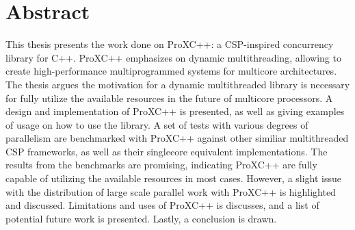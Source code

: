 
\newpage
{}
\section*{Abstract}

This thesis presents the work done on ProXC++: a CSP\hyp{}inspired concurrency library for C++. ProXC++ emphasizes on dynamic multithreading, allowing to create high\hyp{}performance multiprogrammed systems for multicore architectures. The thesis argues the motivation for a dynamic multithreaded library is necessary for fully utilize the available resources in the future of multicore processors. A design and implementation of ProXC++ is presented, as well as giving examples of usage on how to use the library. A set of tests with various degrees of parallelism are benchmarked with ProXC++ against other similiar multithreaded CSP frameworks, as well as their singlecore equivalent implementations. The results from the benchmarks are promising, indicating ProXC++ are fully capable of utilizing the available resources in most cases. However, a slight issue with the distribution of large scale parallel work with ProXC++ is highlighted and discussed. Limitations and uses of ProXC++ is discusses, and a list of potential future work is presented. Lastly, a conclusion is drawn.

\vfill

\afterpage{\blankpage}
